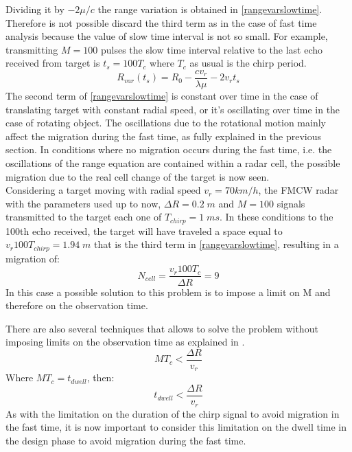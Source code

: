 Dividing it by $-2\mu/c$ the range variation is obtained in \ref{rangevarslowtime}. Therefore is not possible discard the third term as in the case of fast time analysis because the value of slow time interval is not so small. For example, transmitting $M = 100$ pulses the slow time interval relative to the last echo received from target is $t_s = 100 T_c$ where $T_c$ as usual is the chirp period.
\begin{equation}
    R_{var}(t_s) = R_0 - \frac{c v_{r}}{\lambda \mu} -2v_r t_s
    \label{rangevarslowtime}
\end{equation} 
The second term of \ref{rangevarslowtime} is constant over time in the case of translating target with constant radial speed, or it's oscillating over time in the case of rotating object. The oscillations due to the rotational motion mainly affect the migration during the fast time, as fully explained in the previous section. In conditions where no migration occurs during the fast time, i.e. the oscillations of the range equation are contained within a radar cell, the possible migration due to the real cell change of the target is now seen.\\
Considering a target moving with radial speed $ v_r = 70km / h $, the FMCW radar with the parameters used up to now, $\Delta R = 0.2\;m$ and $ M = 100 $ signals transmitted to the target each one of $T_{chirp} = 1\;ms$. In these conditions to the 100th echo received, the target will have traveled a space equal to $ v_r 100 T_{chirp} = 1.94\;m$ that is the third term in \ref{rangevarslowtime}, resulting in a migration of:
\begin{equation}
     N_{cell}  = \frac{v_r 100 T_c}{\Delta R} = 9
\end{equation}
In this case a possible solution to this problem is to impose a limit on M and therefore on the observation time.

There are also several techniques that allows to solve the problem without imposing limits on the observation time as explained in \cite{Roos2016RangeMC}.
\begin{equation}
M T_{c} < \frac{\Delta R}{v_r}
\end{equation}
Where $M T_c = t_{dwell}$, then:
\begin{equation}
t_{dwell} < \frac{\Delta R}{v_r}
\end{equation}
As with the limitation on the duration of the chirp signal to avoid migration in the fast time, it is now important to consider this limitation on the dwell time in the design phase to avoid migration during the fast time.


